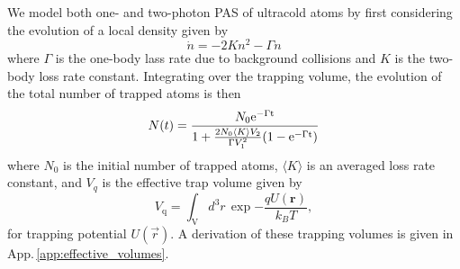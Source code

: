 We model both one- and two-photon PAS of ultracold atoms by first considering the evolution of a local density given by
\begin{equation}
	\dot{n} = -2 K n^2 - \Gamma n
\end{equation}
where $\Gamma$ is the one-body lass rate due to background collisions and $K$ is the two-body loss rate constant.
Integrating over the trapping volume, the evolution of the total number of trapped atoms is then
\begin{equation}\label{eq:number}
   N(t)= \frac{N_0 \rm{e}^{-\Gamma t}}
   		{ 1 + \frac{2 N_0 \langle K \rangle V_2}{\Gamma V_1^2}(1-\rm{e}^{-\Gamma t}) }
\end{equation}
where $N_0$ is the initial number of trapped atoms, $\langle K \rangle$ is an averaged loss rate constant, and $V_q$ is the effective trap volume given by
\begin{equation}\label{eq:effectivevolumes}
	V_{\text{q}}=\int_{\mathrm{V}} d^3r \, \exp{-\frac{qU(\mathbf{r})}{k_{B}T}},
\end{equation}
for trapping potential $U(\vec{r})$.
A derivation of these trapping volumes is given in App.\,\ref{app:effective_volumes}.

